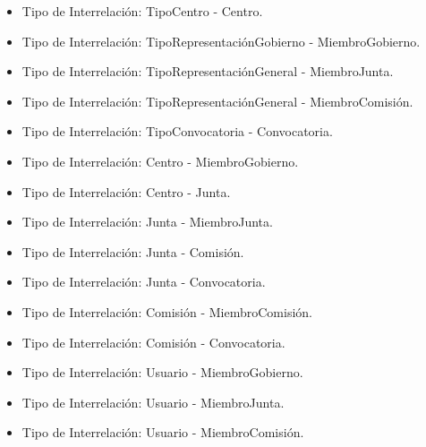 \begin{itemize}
    \item Tipo de Interrelación: TipoCentro - Centro.
    \item Tipo de Interrelación: TipoRepresentaciónGobierno - MiembroGobierno.
    \item Tipo de Interrelación: TipoRepresentaciónGeneral - MiembroJunta.
    \item Tipo de Interrelación: TipoRepresentaciónGeneral - MiembroComisión.
    \item Tipo de Interrelación: TipoConvocatoria - Convocatoria.
    \item Tipo de Interrelación: Centro - MiembroGobierno.
    \item Tipo de Interrelación: Centro - Junta.
    \item Tipo de Interrelación: Junta - MiembroJunta.
    \item Tipo de Interrelación: Junta - Comisión.
    \item Tipo de Interrelación: Junta - Convocatoria.
    \item Tipo de Interrelación: Comisión - MiembroComisión.
    \item Tipo de Interrelación: Comisión - Convocatoria.
    \item Tipo de Interrelación: Usuario - MiembroGobierno.
    \item Tipo de Interrelación: Usuario - MiembroJunta.
    \item Tipo de Interrelación: Usuario - MiembroComisión.
\end{itemize}

